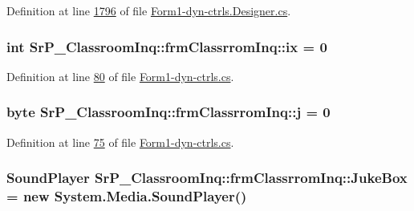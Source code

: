 \-Definition at line \hyperlink{_form1-dyn-ctrls_8_designer_8cs_source_l01796}{1796} of file \hyperlink{_form1-dyn-ctrls_8_designer_8cs_source}{\-Form1-\/dyn-\/ctrls.\-Designer.\-cs}.

\hypertarget{class_sr_p___classroom_inq_1_1frm_classrrom_inq_a1f5209850965916fddf21b2409e6204a}{
\subsubsection[{ix}]{\setlength{\rightskip}{0pt plus 5cm}int {\bf \-Sr\-P\-\_\-\-Classroom\-Inq\-::frm\-Classrrom\-Inq\-::ix} = 0}}
\label{class_sr_p___classroom_inq_1_1frm_classrrom_inq_a1f5209850965916fddf21b2409e6204a}


\-Definition at line \hyperlink{_form1-dyn-ctrls_8cs_source_l00080}{80} of file \hyperlink{_form1-dyn-ctrls_8cs_source}{\-Form1-\/dyn-\/ctrls.\-cs}.

\hypertarget{class_sr_p___classroom_inq_1_1frm_classrrom_inq_a2eb87c50d0e2c90c1256a6e26cc8a651}{
\subsubsection[{j}]{\setlength{\rightskip}{0pt plus 5cm}byte {\bf \-Sr\-P\-\_\-\-Classroom\-Inq\-::frm\-Classrrom\-Inq\-::j} = 0}}
\label{class_sr_p___classroom_inq_1_1frm_classrrom_inq_a2eb87c50d0e2c90c1256a6e26cc8a651}


\-Definition at line \hyperlink{_form1-dyn-ctrls_8cs_source_l00075}{75} of file \hyperlink{_form1-dyn-ctrls_8cs_source}{\-Form1-\/dyn-\/ctrls.\-cs}.

\hypertarget{class_sr_p___classroom_inq_1_1frm_classrrom_inq_a10f0b7ba2800c1353aeee71344d08a94}{
\subsubsection[{\-Juke\-Box}]{\setlength{\rightskip}{0pt plus 5cm}\-Sound\-Player {\bf \-Sr\-P\-\_\-\-Classroom\-Inq\-::frm\-Classrrom\-Inq\-::\-Juke\-Box} = new \-System.\-Media.\-Sound\-Player()}}
\label{class_sr_p___classroom_inq_1_1frm_classrrom_inq_a10f0b7ba2800c1353aeee71344d08a94}


